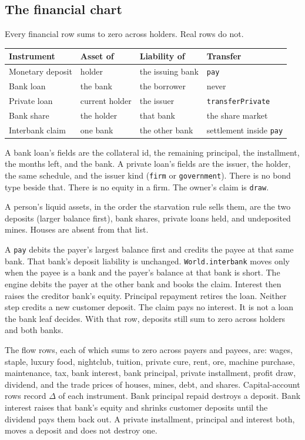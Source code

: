 \documentclass[11pt]{article}
\begin{document}
\subsection{The financial chart}

Every financial row sums to zero across holders. Real rows do not.

\begin{center}
\small
\begin{tabular}{@{}llll@{}}
\toprule
Instrument & Asset of & Liability of & Transfer \\
\midrule
Monetary deposit & holder & the issuing bank & \texttt{pay} \\
Bank loan & the bank & the borrower & never \\
Private loan & current holder & the issuer & \texttt{transferPrivate} \\
Bank share & the holder & that bank & the share market \\
Interbank claim & one bank & the other bank & settlement inside \texttt{pay} \\
\bottomrule
\end{tabular}
\end{center}

A bank loan's fields are the collateral id, the remaining principal, the
installment, the months left, and the bank. A private loan's fields are the
issuer, the holder, the same schedule, and the issuer kind
(\texttt{firm} or \texttt{government}). There is no bond type beside that.
There is no equity in a firm. The owner's claim is \texttt{draw}.

A person's liquid assets, in the order the starvation rule sells them, are
the two deposits (larger balance first), bank shares, private loans held,
and undeposited mines. Houses are absent from that list.

A \texttt{pay} debits the payer's largest balance first and credits the
payee at that same bank. That bank's deposit liability is unchanged.
\texttt{World.interbank} moves only when the payee is a bank and the
payer's balance at that bank is short. The engine debits the payer at the
other bank and books the claim. Interest then raises the creditor bank's
equity. Principal repayment retires the loan. Neither step credits a new
customer deposit. The claim pays no interest. It is not a loan the bank
leaf decides. With that row, deposits still sum to zero across holders and
both banks.

The flow rows, each of which sums to zero across payers and payees, are:
wages, staple, luxury food, nightclub, tuition, private cure, rent, ore,
machine purchase, maintenance, tax, bank interest, bank principal, private
installment, profit draw, dividend, and the trade prices of houses, mines,
debt, and shares. Capital-account rows record $\Delta$ of each instrument.
Bank principal repaid destroys a deposit. Bank interest raises that bank's
equity and shrinks customer deposits until the dividend pays them back out.
A private installment, principal and interest both, moves a deposit and does
not destroy one.
\end{document}
